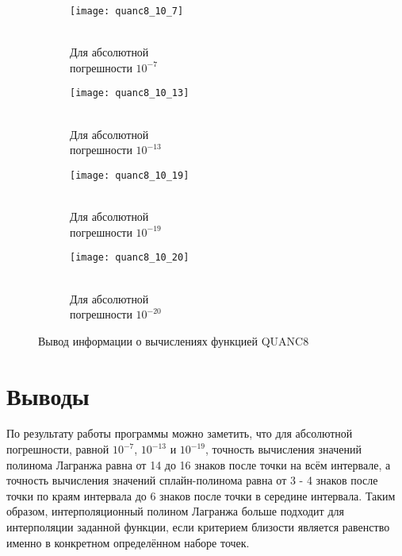 \begin{figure}[H]
\begin{center}
	\begin{subfigure}[b]{0.24\textwidth}
		\texttt{[image: quanc8\_10\_7]}
		\caption{\\Для абсолютной \\погрешности $10^{-7}$}
		\label{pic:demo4:1}
	\end{subfigure}
	\begin{subfigure}[b]{0.24\textwidth}
		\texttt{[image: quanc8\_10\_13]}
		\caption{\\Для абсолютной \\погрешности $10^{-13}$}
		\label{pic:demo4:2}
	\end{subfigure}
	\begin{subfigure}[b]{0.24\textwidth}
		\texttt{[image: quanc8\_10\_19]}
		\captionsetup{justification=centering}
		\caption{\\Для абсолютной \\погрешности $10^{-19}$}
		\label{pic:demo4:3}
	\end{subfigure}
	\begin{subfigure}[b]{0.24\textwidth}
		\texttt{[image: quanc8\_10\_20]}
		\captionsetup{justification=centering}
		\caption{\\Для абсолютной \\погрешности $10^{-20}$}
		\label{pic:demo4:4}
	\end{subfigure}
	\caption{Вывод информации о вычислениях функцией QUANC8}
	\label{pic:demo4}
\end{center}
\end{figure}

\section{Выводы}

По результату работы программы можно заметить, что для абсолютной погрешности, равной $10^{-7}$, $10^{-13}$ и $10^{-19}$, точность вычисления значений полинома Лагранжа равна от 14 до 16 знаков после точки на всём интервале, а точность вычисления значений сплайн-полинома равна от 3 - 4 знаков после точки по краям интервала до 6 знаков после точки в середине интервала. Таким образом, интерполяционный полином Лагранжа больше подходит для интерполяции заданной функции, если критерием близости является равенство именно в конкретном определённом наборе точек.%


